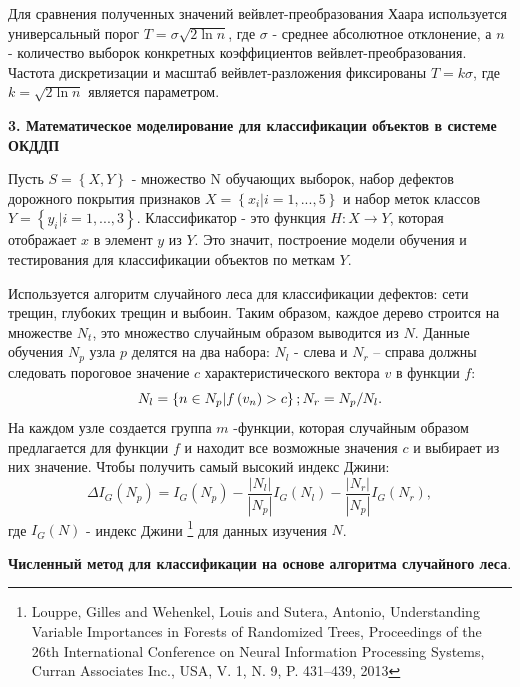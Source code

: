 Для сравнения полученных значений вейвлет-преобразования Хаара используется универсальный порог $ T = \sigma \sqrt {2 \ln n} $, где $ \sigma $ - среднее абсолютное отклонение, а $ n $ - количество выборок конкретных коэффициентов вейвлет-преобразования. Частота дискретизации и масштаб вейвлет-разложения фиксированы $ T = k \sigma $, где $ k = \sqrt {2 \ln n} $ является параметром.

\textbf{3. Математическое моделирование для классификации объектов в системе ОКДДП}

Пусть $S=\left\{X, Y\right\}$ - множество N обучающих выборок, набор дефектов дорожного покрытия признаков $X=\left\{x_i | i = 1, ..., 5\right\}$ и набор меток классов $Y = \left\{y_i |i = 1, ..., 3\right\}$. Классификатор - это функция $H: X \rightarrow Y$, которая отображает $x$ в элемент $y$ из $Y$. Это значит, построение модели обучения и тестирования для классификации объектов по меткам $Y$.

Используется алгоритм случайного леса для классификации дефектов: сети трещин, глубоких трещин и выбоин. Таким образом, каждое дерево строится на множестве $N_t$, это множество случайным образом выводится из $N$. Данные обучения $N_p$ узла $p$ делятся на два набора: $N_l$ - слева и $N_r$ – справа должны следовать пороговое значение $c$ характеристического вектора $v$ в функции $f$:
\begin{equation}\label{eq11}
N_l = \left\{n \in N_p | f\left(v_n\right) > c\right\};  \\
N_r=N_p / N_l.
\end{equation}
На каждом узле создается группа $ m $ -функции, которая случайным образом предлагается для функции $ f $ и находит все возможные значения $ c $ и выбирает из них значение. Чтобы получить самый высокий индекс Джини:
\begin{equation}\label{eq12}
\Delta I_G\left(N_p\right)=I_G\left(N_p\right) - \frac{|N_l|}{|N_p|}I_G\left(N_l\right) - \frac{|N_r|}{|N_p|}I_G\left(N_r\right), 
\end{equation} где $I_G\left(N\right)$ - индекс Джини \footnote {Louppe, Gilles and Wehenkel, Louis and Sutera, Antonio, Understanding Variable Importances in Forests of Randomized Trees, Proceedings of the 26th International Conference on Neural Information Processing Systems, Curran Associates Inc., USA, V. 1, N. 9, P. 431--439, 2013} для данных изучения $N$.

\newpage \textbf{Численный метод для классификации на основе алгоритма случайного леса}.

